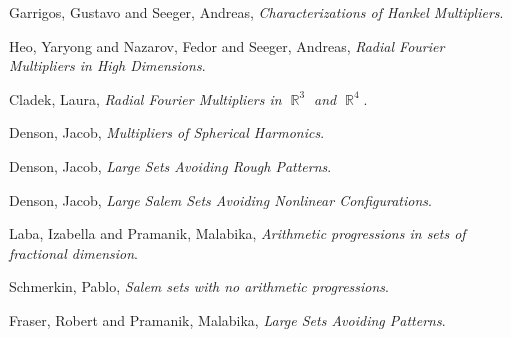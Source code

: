 \documentclass[12pt]{article}
\DeclareMathOperator{\RR}{\mathbb{R}}
\begin{document}
\begin{thebibliography}{03}

 Garrigos, Gustavo and Seeger, Andreas,
	\emph{Characterizations of {H}ankel Multipliers}.

 Heo, Yaryong and Nazarov, Fedor and Seeger, Andreas,
	\emph{Radial {F}ourier Multipliers in High Dimensions}.

 Cladek, Laura,
	\emph{Radial {F}ourier Multipliers in $\RR^3$ and $\RR^4$}.

 Denson, Jacob,
	\emph{Multipliers of Spherical Harmonics}.

 Denson, Jacob,
 	\emph{Large Sets Avoiding Rough Patterns}.

 Denson, Jacob,
	\emph{Large Salem Sets Avoiding Nonlinear Configurations}.

 Laba, Izabella and Pramanik, Malabika,
	\emph{Arithmetic progressions in sets of fractional dimension}.

 Schmerkin, Pablo,
	\emph{{S}alem sets with no arithmetic progressions}.

 Fraser, Robert and Pramanik, Malabika,
	\emph{Large Sets Avoiding Patterns}.

\end{thebibliography}
\end{document}
